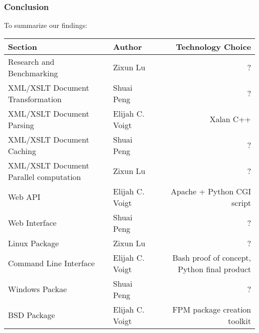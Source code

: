 \subsubsection{Conclusion}

To summarize our findings:

\begin{center}
    \begin{tabular}{ | l | p{5cm} | r | }
    \hline
    Section & Author & Technology Choice\\ \hline
    Research and Benchmarking & Zixun Lu & ? \\ \hline
    XML/XSLT Document Transformation & Shuai Peng & ? \\ \hline
    XML/XSLT Document Parsing & Elijah C. Voigt & Xalan C++ \\ \hline
    XML/XSLT Document Caching & Shuai Peng & ? \\ \hline
    XML/XSLT Document Parallel computation & Zixun Lu & ? \\ \hline
    Web API & Elijah C. Voigt & Apache + Python CGI script \\ \hline
    Web Interface & Shuai Peng & ? \\ \hline
    Linux Package & Zixun Lu & ? \\ \hline
    Command Line Interface& Elijah C. Voigt & Bash proof of concept, Python final product \\ \hline
    Windows Packae & Shuai Peng & ? \\ \hline
    BSD Package & Elijah C. Voigt & FPM package creation toolkit \\ \hline
    \end{tabular}
\end{center}

\clearpage

